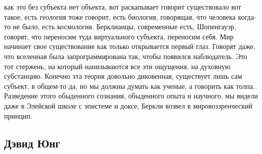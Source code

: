 \documentclass[a4paper, 12pt]{article}
\begin{document}
как это без субъекта нет объекта, вот раскапывает говорит существовало 
вот такое, есть геология тоже говорит, есть биология, говорящая, что 
человека когда-то не было, есть космология. Берклианцы, современные 
есть, Шопенгауэр, говорят, что переносим туда виртуального субъекта, 
переносим себя. Мир начинает свое существование как только открывается 
первый глаз. Говорят даже, что вселенная была запрограммирована так, 
чтобы появился наблюдатель. Это тот стержень, на который нанизываются 
все эти ощущения, на духовную субстанцию. Конечно эта теория довольно 
диковенная, существует лишь сам субъект, в общем-то да, но мы должны 
думать как ученые, а говорить как толпа. Разведение этого обыденного 
сознания, обыденного опыта и научного, мы видели даже в Элейской школе 
с эпистеме и доксе, Беркли возвел в мировоззренческий принцип.

\subsection{Дэвид Юнг}
\end{document}
